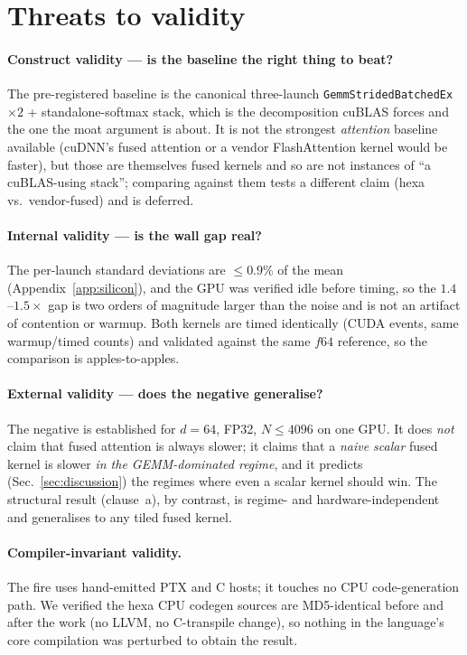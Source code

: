 \documentclass[11pt,a4paper]{article}
\newcommand{\verdict}[1]{\texttt{#1}}
\begin{document}
\section{Threats to validity}
\label{sec:threats}

\paragraph{Construct validity --- is the baseline the right thing to beat?}
The pre-registered baseline is the canonical three-launch
\verdict{GemmStridedBatchedEx}$\times 2$ + standalone-softmax stack, which is the
decomposition cuBLAS forces and the one the moat argument is about. It is not the
strongest \emph{attention} baseline available (cuDNN's fused attention or a
vendor FlashAttention kernel would be faster), but those are themselves fused
kernels and so are not instances of ``a cuBLAS-using stack''; comparing against
them tests a different claim (hexa vs.\ vendor-fused) and is deferred.

\paragraph{Internal validity --- is the wall gap real?}
The per-launch standard deviations are $\leq 0.9\%$ of the mean
(Appendix~\ref{app:silicon}), and the GPU was verified idle before timing, so the
$1.4$--$1.5\times$ gap is two orders of magnitude larger than the noise and is
not an artifact of contention or warmup. Both kernels are timed identically
(CUDA events, same warmup/timed counts) and validated against the same $f64$
reference, so the comparison is apples-to-apples.

\paragraph{External validity --- does the negative generalise?}
The negative is established for $d{=}64$, FP32, $N\le 4096$ on one GPU. It does
\emph{not} claim that fused attention is always slower; it claims that a
\emph{naive scalar} fused kernel is slower \emph{in the GEMM-dominated regime},
and it predicts (Sec.~\ref{sec:discussion}) the regimes where even a scalar
kernel should win. The structural result (clause~a), by contrast, is regime- and
hardware-independent and generalises to any tiled fused kernel.

\paragraph{Compiler-invariant validity.}
The fire uses hand-emitted PTX and C hosts; it touches no CPU code-generation
path. We verified the hexa CPU codegen sources are MD5-identical before and
after the work (no LLVM, no C-transpile change), so nothing in the language's
core compilation was perturbed to obtain the result.
\end{document}
